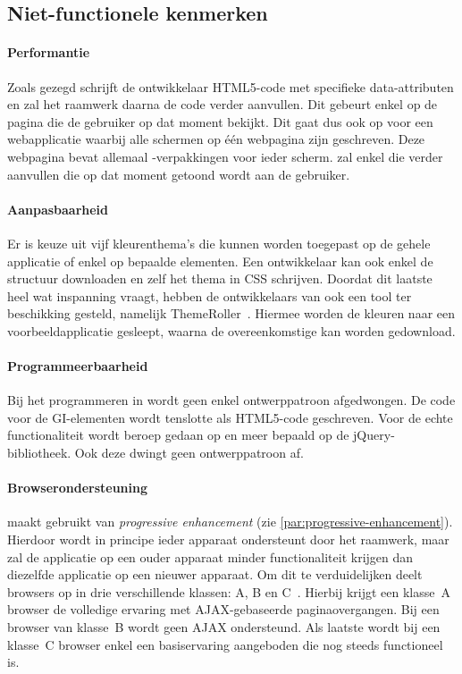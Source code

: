 \subsection{Niet-functionele kenmerken}
\paragraph{Performantie}
Zoals gezegd schrijft de ontwikkelaar HTML5-code met specifieke data-attributen en zal het raamwerk daarna de code verder aanvullen. 
Dit gebeurt enkel op de pagina die de gebruiker op dat moment bekijkt. 
Dit gaat dus ook op voor een webapplicatie waarbij alle schermen op één webpagina zijn geschreven. 
Deze webpagina bevat allemaal -verpakkingen voor ieder scherm. 
\jqm{} zal enkel die  verder aanvullen die op dat moment getoond wordt aan de gebruiker. 

\paragraph{Aanpasbaarheid}
Er is keuze uit vijf kleurenthema's die kunnen worden toegepast op de gehele applicatie of enkel op bepaalde elementen. 
Een ontwikkelaar kan ook enkel de structuur downloaden en zelf het thema in CSS schrijven. 
Doordat dit laatste heel wat inspanning vraagt, hebben de ontwikkelaars van \jqm{} ook een tool ter beschikking gesteld, namelijk ThemeRoller~\cite{JQuery2012c}. 
Hiermee worden de kleuren naar een voorbeeldapplicatie gesleept, waarna de overeenkomstige  kan worden gedownload.

\paragraph{Programmeerbaarheid}
Bij het programmeren in \jqm{} wordt geen enkel ontwerppatroon afgedwongen. 
De code voor de GI-elementen wordt tenslotte als HTML5-code geschreven.
Voor de echte functionaliteit wordt beroep gedaan op \js{} en meer bepaald op de jQuery-bibliotheek. 
Ook deze dwingt geen ontwerppatroon af.

\paragraph{Browserondersteuning}
\label{sec:jqm-browser-support}

\jqm{} maakt gebruikt van \emph{progressive enhancement} (zie \ref{par:progressive-enhancement}).
Hierdoor wordt in principe ieder apparaat ondersteunt door het raamwerk, maar zal de applicatie op een ouder apparaat minder functionaliteit krijgen dan diezelfde applicatie op een nieuwer apparaat.
Om dit te verduidelijken deelt \jqm{} browsers op in drie verschillende klassen: A, B en C~\cite{JQuery2012d}. 
Hierbij krijgt een klasse~A browser de volledige ervaring met AJAX-gebaseerde paginaovergangen.
Bij een browser van klasse~B wordt geen AJAX ondersteund.
Als laatste wordt bij een klasse~C browser enkel een basiservaring aangeboden die nog steeds functioneel is.

